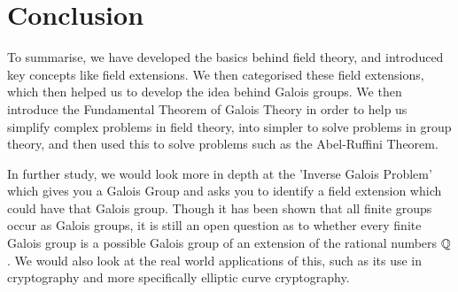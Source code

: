 \section{Conclusion}
To summarise, we have developed the basics behind field theory, and introduced key concepts like field extensions. We then categorised these field extensions, which then helped us to develop the idea behind Galois groups. We then introduce the Fundamental Theorem of Galois Theory in order to help us simplify complex problems in field theory, into simpler to solve problems in group theory, and then used this to solve problems such as the Abel-Ruffini Theorem.

In further study, we would look more in depth at the 'Inverse Galois Problem' which gives you a Galois Group and asks you to identify a field extension which could have that Galois group. Though it has been shown that all finite groups occur as Galois groups, it is still an open question as to whether every finite Galois group is a possible Galois group of an extension of the rational numbers $\mathbb Q$. We would also look  at the real world applications of this, such as its use in cryptography and more specifically elliptic curve cryptography.